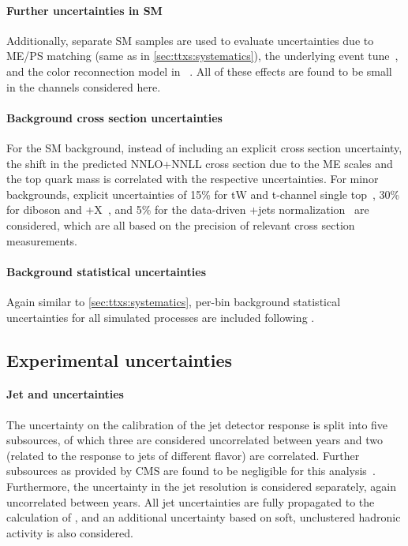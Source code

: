 \paragraph{Further uncertainties in SM \ttbar}
Additionally, separate SM \ttbar samples are used to evaluate uncertainties due to ME/PS matching (same as in \cref{sec:ttxs:systematics}), the underlying event tune~\cite{CMS:GEN-17-001}, and the color reconnection model in \pythia~\cite{CMS:GEN-17-002,Christiansen:2015yqa}. All of these effects are found to be small in the channels considered here.

\paragraph{Background cross section uncertainties}
For the SM \ttbar background, instead of including an explicit cross section uncertainty, the shift in the predicted NNLO+NNLL \ttbar cross section due to the ME scales and the top quark mass is correlated with the respective uncertainties. For minor backgrounds, explicit uncertainties of 15\% for tW and t-channel single top~\cite{ATLAS:2016ymp,CMS:TOP-17-011,CMS:TOP-17-018}, 30\% for diboson and \ttbar+X~\cite{CMS:TOP-17-005,ATLAS:2019njj}, and 5\% for the data-driven \Zgamma+jets normalization~\cite{ATLAS:2016oxs} are considered, which are all based on the precision of relevant cross section measurements.

\paragraph{Background statistical uncertainties}
Again similar to \cref{sec:ttxs:systematics}, per-bin background statistical uncertainties for all simulated processes are included following .

\subsection{Experimental uncertainties}
\label{sec:ah:expsysts}

\paragraph{Jet and \ptmiss uncertainties}
The uncertainty on the calibration of the jet \pt detector response is split into five subsources, of which three are considered uncorrelated between years and two (related to the response to jets of different flavor) are correlated. Further subsources as provided by CMS are found to be negligible for this analysis~\cite{CMS:JME-13-004}. Furthermore, the uncertainty in the jet \pt resolution is considered separately, again uncorrelated between years. All jet uncertainties are fully propagated to the calculation of \ptmiss, and an additional \ptmiss uncertainty based on soft, unclustered hadronic activity is also considered.

